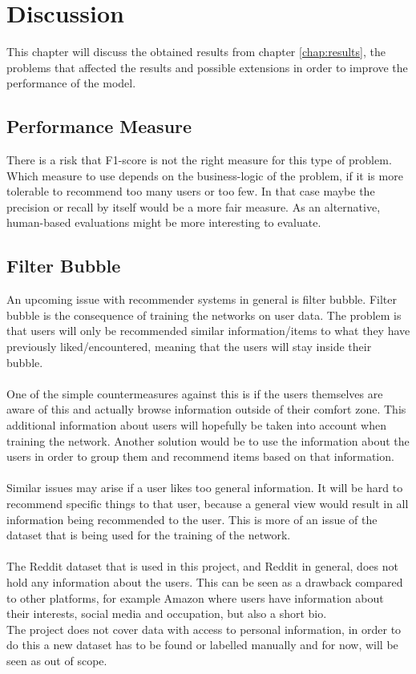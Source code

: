 \chapter{Discussion}

This chapter will discuss the obtained results from chapter \ref{chap:results}, the problems that affected the results and possible extensions in order to improve the performance of the model.

\section{Performance Measure}%
There is a risk that F1-score is not the right measure for this type of problem. Which measure to use depends on the business-logic of the problem, if it is more tolerable to recommend too many users or too few. In that case maybe the precision or recall by itself would be a more fair measure. 
As an alternative, human-based evaluations might be more interesting to evaluate.

\section{Filter Bubble}
An upcoming issue with recommender systems in general is filter bubble. \parencite{nguyen2014exploring}
Filter bubble is the consequence of training the networks on user data. The problem is that users will only be recommended similar information/items to what they have previously liked/encountered, meaning that the users will stay inside their bubble. 
\\\\
One of the simple countermeasures against this is if the users themselves are aware of this and actually browse information outside of their comfort zone. This additional information about users will hopefully be taken into account when training the network. Another solution would be to use the information about the users in order to group them and recommend items based on that information.
\\\\
Similar issues may arise if a user likes too general information. It will be hard to recommend specific things to that user, because a general view would result in all information being recommended to the user. This is more of an issue of the dataset that is being used for the training of the network. 
\\\\
The Reddit dataset that is used in this project, and Reddit in general, does not hold any information about the users. This can be seen as a drawback compared to other platforms, for example Amazon where users have information about their interests, social media and occupation, but also a short bio. \\
The project does not cover data with access to personal information, in order to do this a new dataset has to be found or labelled manually and for now, will be seen as out of scope.

